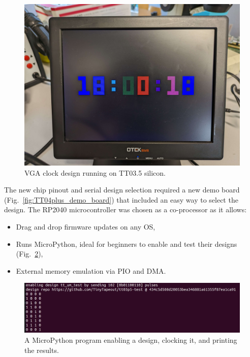 \begin{figure}[!t]
\centering
\includegraphics[width=\columnwidth]{./Figs/tt3p5 vga clock.jpg}
\caption{VGA clock design running on TT03.5 silicon.}
\label{fig:VGA_clock_design_TT03_5_silicon}
\end{figure}

The new chip pinout and serial design selection required a new demo board (Fig.~\ref{fig:TT04plus_demo_board}) that included an easy way to select the design.
The RP2040 microcontroller was chosen as a co-processor as it allows:

\begin{itemize}
\item Drag and drop firmware updates on any OS,
\item Runs MicroPython\cite{micropython}, ideal for beginners to enable and test their designs (Fig.~\ref{fig:micropython_program}),
\item External memory emulation via PIO and DMA.
\end{itemize}

\begin{figure}[!t]
\centering
\includegraphics[width=\columnwidth]{./Figs/tt3p5 enable design.png}
\caption{A MicroPython program\cite{demofirmwaretest} enabling a design, clocking it, and printing the results.}
\label{fig:micropython_program}
\end{figure}

